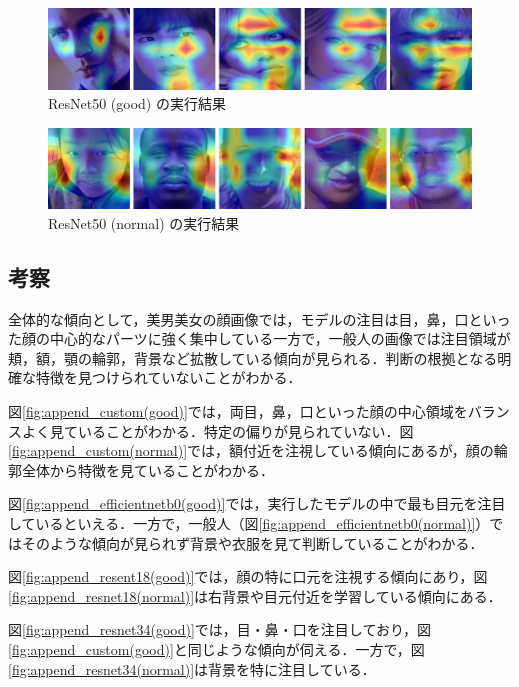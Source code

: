 \documentclass[a4paper,11pt,titlepage]{jsarticle}
\begin{document}
\begin{figure}[H]
    \centering
    \includegraphics[width=1.1\textwidth]{resnet50(good).jpg}
    \caption{ResNet50 (good) の実行結果}
    \label{fig:append_resnet50(good)}
\end{figure}

\begin{figure}[H]
    \centering
    \includegraphics[width=1.1\textwidth]{resnet50(normal).jpg}
    \caption{ResNet50 (normal) の実行結果}
    \label{fig:append_resnet50(normal)}
\end{figure}


\subsection{考察}
全体的な傾向として，美男美女の顔画像では，モデルの注目は目，鼻，口といった顔の中心的なパーツに強く集中している一方で，一般人の画像では注目領域が頬，額，顎の輪郭，背景など拡散している傾向が見られる．判断の根拠となる明確な特徴を見つけられていないことがわかる．


図\ref{fig:append_custom(good)}では，両目，鼻，口といった顔の中心領域をバランスよく見ていることがわかる．特定の偏りが見られていない．図\ref{fig:append_custom(normal)}では，額付近を注視している傾向にあるが，顔の輪郭全体から特徴を見ていることがわかる．\par
図\ref{fig:append_efficientnetb0(good)}では，実行したモデルの中で最も目元を注目しているといえる．一方で，一般人（図\ref{fig:append_efficientnetb0(normal)}）ではそのような傾向が見られず背景や衣服を見て判断していることがわかる．\par

図\ref{fig:append_resent18(good)}では，顔の特に口元を注視する傾向にあり，図\ref{fig:append_resnet18(normal)}は右背景や目元付近を学習している傾向にある．\par
図\ref{fig:append_resnet34(good)}では，目・鼻・口を注目しており，図\ref{fig:append_custom(good)}と同じような傾向が伺える．一方で，図\ref{fig:append_resnet34(normal)}は背景を特に注目している．\par
\end{document}
